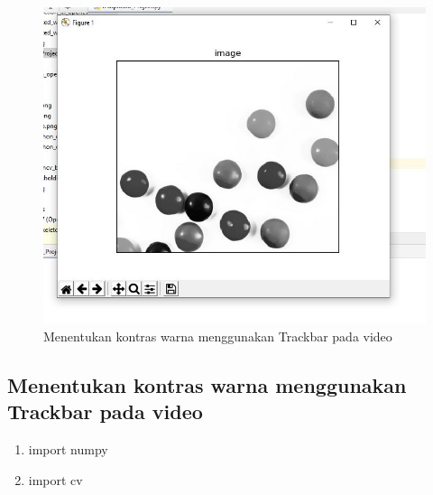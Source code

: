 \newpage
\begin{figure}[ht]
\centering
\includegraphics[scale=0.5]{figures/2,50.jpg}
\caption{Menentukan kontras warna menggunakan Trackbar pada video}
\label{contoh}
\end{figure}






\newpage
\subsection{Menentukan kontras warna menggunakan Trackbar pada video}

\begin{enumerate}
	\item import numpy
	\item import cv
\end{enumerate}

